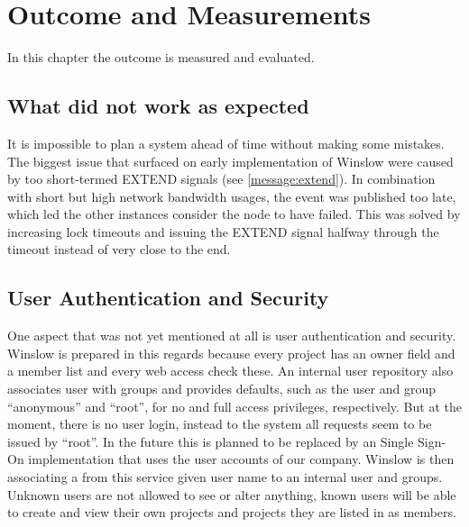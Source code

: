 \chapter{Outcome and Measurements}

In this chapter the outcome is measured and evaluated.


\section{What did not work as expected}


It is impossible to plan a system ahead of time without making some mistakes.
The biggest issue that surfaced on early implementation of Winslow were caused by too short-termed EXTEND signals (see \autoref{message:extend}).
In combination with short but high network bandwidth usages, the event was published too late, which led the other instances consider the node to have failed.
This was solved by increasing lock timeouts and issuing the EXTEND signal halfway through the timeout instead of very close to the end.


\section{User Authentication and Security}
\label{outcome:ssl}

One aspect that was not yet mentioned at all is user authentication and security.
Winslow is prepared in this regards because every project has an owner field and a member list and every web access check these.
An internal user repository also associates user with groups and provides defaults, such as the user and group \enquote{anonymous} and \enquote{root}, for no and full access privileges, respectively.
But at the moment, there is no user login, instead to the system all requests seem to be issued by \enquote{root}.
In the future this is planned to be replaced by an Single Sign-On implementation that uses the user accounts of our company.
Winslow is then associating a from this service given user name to an internal user and groups.
Unknown users are not allowed to see or alter anything, known users will be able to create and view their own projects and projects they are listed in as members.

